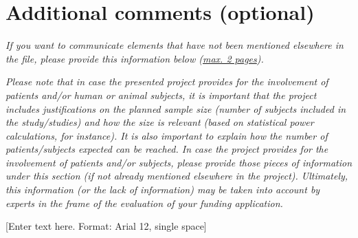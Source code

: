 \documentclass{fnrscq}
\begin{document}
\section{Additional comments (optional)}

\textit{\footnotesize If you want to communicate elements that have not been mentioned
  elsewhere in the file, please provide this information below (\uline{max. 2 pages}).}

\textit{\footnotesize Please note that in case the presented project provides for the
  involvement of patients and/or human or animal subjects, it is important that the project
  includes justifications on the planned sample size (number of subjects included in the
  study/studies) and how the size is relevant (based on statistical power calculations, for
  instance). It is also important to explain how the number of patients/subjects expected
  can be reached. In case the project provides for the involvement of patients and/or
  subjects, please provide those pieces of information under this section (if not already
  mentioned elsewhere in the project). Ultimately, this information (or the lack of
  information) may be taken into account by experts in the frame of the evaluation of your
  funding application.}

[Enter text here. Format: Arial 12, single space]
\end{document}
